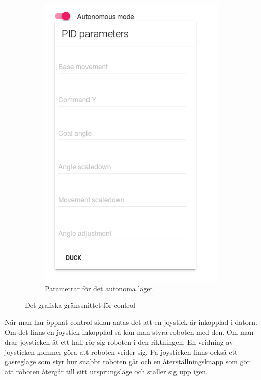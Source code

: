 \documentclass[a4paper,titlepage,12pt]{article}
\begin{document}
\begin{figure}[h]
\begin{subfigure}{.5\textwidth}
		\includegraphics[width=1\linewidth]{images/gui-parameters.png}
		\caption{Parametrar för det autonoma läget}
      \end{subfigure}
      \caption{Det grafiska gränssnittet för control\label{fig:gui-control}}
	\end{figure}
	
	När man har öppnat control sidan antas det att en joystick är inkopplad i
    datorn. Om det finns en joystick inkopplad så kan man styra roboten med den.
    Om man drar joysticken åt ett håll rör sig roboten i den riktningen, En
    vridning av joysticken kommer göra att roboten vrider sig. På joysticken
    finns också ett gasreglage som styr hur snabbt roboten går och en
    återställningsknapp som gör att roboten återgår till sitt ursprungsläge och
    ställer sig upp igen.
\end{document}
